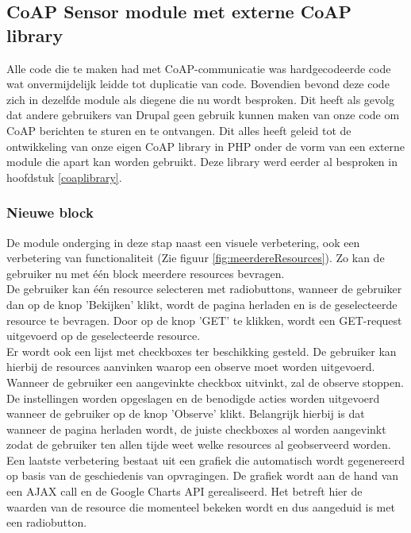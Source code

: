 \subsection{CoAP Sensor module met externe CoAP library}
Alle code die te maken had met CoAP-communicatie was hardgecodeerde code wat onvermijdelijk leidde tot duplicatie van code. Bovendien bevond deze code zich in dezelfde module als diegene die nu wordt besproken. Dit heeft als gevolg dat andere gebruikers van Drupal geen gebruik kunnen maken van onze code om CoAP berichten te sturen en te ontvangen. Dit alles heeft geleid tot de ontwikkeling van onze eigen CoAP library in PHP onder de vorm van een externe module die apart kan worden gebruikt. Deze library werd eerder al besproken in hoofdstuk \ref{coaplibrary}.\\

\subsubsection{Nieuwe block}
De module onderging in deze stap naast een visuele verbetering, ook een verbetering van functionaliteit (Zie figuur \ref{fig:meerdereResources}). Zo kan de gebruiker nu met \'{e}\'{e}n block meerdere resources bevragen.\\

De gebruiker kan \'{e}\'{e}n resource selecteren met radiobuttons, wanneer de gebruiker dan op de knop 'Bekijken' klikt, wordt de pagina herladen en is de geselecteerde resource te bevragen. Door op de knop 'GET' te klikken, wordt een GET-request uitgevoerd op de geselecteerde resource.\\
Er wordt ook een lijst met checkboxes ter beschikking gesteld. De gebruiker kan hierbij de resources aanvinken waarop een observe moet worden uitgevoerd. Wanneer de gebruiker een aangevinkte checkbox uitvinkt, zal de observe stoppen. De instellingen worden opgeslagen en de benodigde acties worden uitgevoerd wanneer de gebruiker op de knop 'Observe' klikt. Belangrijk hierbij is dat wanneer de pagina herladen wordt, de juiste checkboxes al worden aangevinkt zodat de gebruiker ten allen tijde weet welke resources al geobserveerd worden.\\
Een laatste verbetering bestaat uit een grafiek die automatisch wordt gegenereerd op basis van de geschiedenis van opvragingen. De grafiek wordt aan de hand van een AJAX call en de Google Charts API \cite{googleCharts} gerealiseerd. Het betreft hier de waarden van de resource die momenteel bekeken wordt en dus aangeduid is met een radiobutton.

